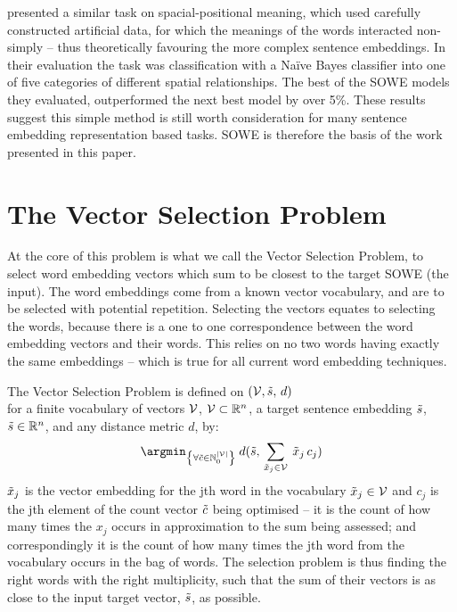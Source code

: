 {\textcite{RitterPosition} presented a similar task on spacial-positional meaning, which used carefully constructed artificial data, for which the meanings of the words interacted non-simply -- thus theoretically favouring the more complex sentence embeddings. In their evaluation the task was classification with a Na{\"i}ve Bayes classifier into one of five categories of different spatial relationships. The best of the SOWE models they evaluated, outperformed the next best model by over 5\%. These results suggest this simple method is still worth consideration for many sentence embedding representation based tasks. SOWE is therefore the basis of the work presented in this paper.

\section{The Vector Selection Problem}\label{frameworkBG}

At the core of this problem is what we call the Vector Selection Problem, to select word embedding vectors which sum to be closest to the target SOWE (the input). The word embeddings come from a known vector vocabulary, and are to be selected with potential repetition.
Selecting the vectors equates to selecting the words, because there is a one to one correspondence between the word embedding vectors and their words. This relies on no two words having exactly the same embeddings -- which is true for all current word embedding techniques.

The Vector Selection Problem
	is defined on $(\mathcal{V}, \tilde{s},\,d)$ \\for a finite vocabulary of vectors $\mathcal{V}$, $\mathcal{V}\subset{\mathbb{R}}^{n}$, a target sentence embedding $ \tilde{s}$, $ \tilde{s}\in\mathbb{R}^{n}$, and any distance metric $d$, by:
		\[
		\argmin_{\left\{ \forall\c\in\N_{0}^{|\V|}\right\} }\:d( \s,\,\sum_{\x_j\in\V}\:\x_{j}\,c_{j})
		\]						
		$\tilde{x}_{j}$ is the vector embedding for the jth word in the vocabulary
		$\tilde{x}_{j}\in\mathcal{V}$ and $c_j$ is the jth element of the count vector $\tilde{c}$ being optimised -- it is the count of how many times the $x_j$ occurs in approximation to the sum being assessed; and correspondingly it is the count of how many times the jth word from the vocabulary occurs in the bag of words.
		The selection problem is thus finding the right words with the right multiplicity, such that the sum of their vectors is as close to the input target vector, $\tilde{s}$, as possible.

}
